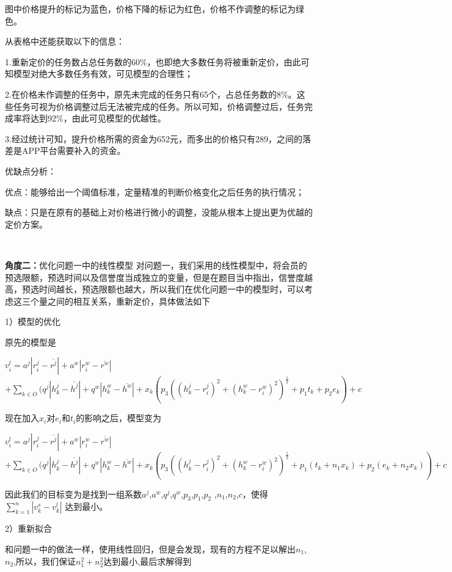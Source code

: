 \documentclass{ctexart}
\begin{document}
图中价格提升的标记为蓝色，价格下降的标记为红色，价格不作调整的标记为绿色。

从表格中还能获取以下的信息：

1.重新定价的任务数占总任务数的60\%，也即绝大多数任务将被重新定价，由此可知模型对绝大多数任务有效，可见模型的合理性；

2.在价格未作调整的任务中，原先未完成的任务只有65个，占总任务数的8\%。这些任务可视为价格调整过后无法被完成的任务。所以可知，价格调整过后，任务完成率将达到92\%，由此可见模型的优越性。

3.经过统计可知，提升价格所需的资金为652元，而多出的价格只有289，之间的落差是APP平台需要补入的资金。

优缺点分析：
	
优点：能够给出一个阈值标准，定量精准的判断价格变化之后任务的执行情况；

缺点：只是在原有的基础上对价格进行微小的调整，没能从根本上提出更为优越的定价方案。

\

\textbf{角度二：}优化问题一中的线性模型
    对问题一，我们采用的线性模型中，将会员的预选限额，预选时间以及信誉度当成独立的变量，但是在题目当中指出，信誉度越高，预选时间越长，预选限额也越大，所以我们在优化问题一中的模型时，可以考虑这三个量之间的相互关系，重新定价，具体做法如下

1）模型的优化

原先的模型是

$v^{l}_{i}=a^{j}|r^{j}_{i}-\overline{r^{j}}|+a^{w}|r^{w}_{i}-\overline{r^{w}}|$
$+\sum\limits_{k\in O}(q^{j}|h^{j}_{k}-\overline{h^{j}}|+q^{w}|h^{w}_{k}-\overline{h^{w}}|+x_{k}(p_{3}((h^{j}_{k}-r^{j}_{i})^{2}+(h^{w}_{k}-r^{w}_{i})^{2})^{\frac{1}{2}}+p_{1}t_{k}+p_{2}e_{k})+c$

现在加入$x_{i}$对$e_{i}$和$t_{i}$的影响之后，模型变为

$v^{l}_{i}=a^{j}|r^{j}_{i}-\overline{r^{j}}|+a^{w}|r^{w}_{i}-\overline{r^{w}}|$
$+\sum\limits_{k\in O}(q^{j}|h^{j}_{k}-\overline{h^{j}}|+q^{w}|h^{w}_{k}-\overline{h^{w}}|+x_{k}(p_{3}((h^{j}_{k}-r^{j}_{i})^{2}+(h^{w}_{k}-r^{w}_{i})^{2})^{\frac{1}{2}}+p_{1}(t_{k}+n_{1}x_{k})+p_{2}(e_{k}+n_{2}x_{k}))+c$

因此我们的目标变为是找到一组系数$a^{j}$,$a^{w}$,$q^{j}$,$q^{w}$,$p_{3}$,$p_{1}$,$p_{2}$ ,$n_{1}$,$n_{2}$,$c$，使得
$ \sum\limits^{n}_{k=1}|v^{s}_{k}-v^{l}_{k}|$
达到最小。

2）重新拟合

和问题一中的做法一样，使用线性回归，但是会发现，现有的方程不足以解出$n_{1}$,$n_{2}$,所以，我们保证$n_{1}^{2}+n_{2}^{2}$达到最小,最后求解得到
\end{document}
